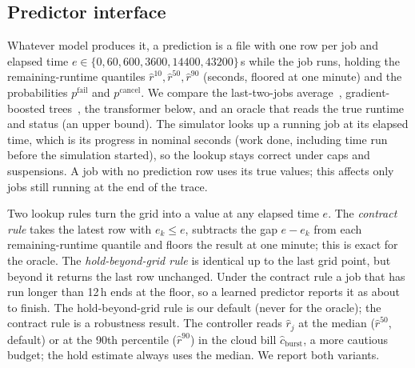 \subsection{Predictor interface}
Whatever model produces it, a prediction is a file with one row per job and elapsed time $e\in\{0,\allowbreak 60,\allowbreak 600,\allowbreak 3600,\allowbreak 14400,\allowbreak 43200\}$\,s while the job runs, holding the remaining-runtime quantiles $\hat r^{10},\hat r^{50},\hat r^{90}$ (seconds, floored at one minute) and the probabilities $p^{\text{fail}}$ and $p^{\text{cancel}}$.
We compare the last-two-jobs average~\cite{tsafrir07}, gradient-boosted trees~\cite{hu21}, the transformer below, and an oracle that reads the true runtime and status (an upper bound).
The simulator looks up a running job at its elapsed time, which is its progress in nominal seconds (work done, including time run before the simulation started), so the lookup stays correct under caps and suspensions. A job with no prediction row uses its true values; this affects only jobs still running at the end of the trace.

Two lookup rules turn the grid into a value at any elapsed time $e$. The \emph{contract rule} takes the latest row with $e_k\le e$, subtracts the gap $e-e_k$ from each remaining-runtime quantile and floors the result at one minute; this is exact for the oracle. The \emph{hold-beyond-grid rule} is identical up to the last grid point, but beyond it returns the last row unchanged. Under the contract rule a job that has run longer than 12\,h ends at the floor, so a learned predictor reports it as about to finish. The hold-beyond-grid rule is our default (never for the oracle); the contract rule is a robustness result.
The controller reads $\hat r_j$ at the median ($\hat r^{50}$, default) or at the 90th percentile ($\hat r^{90}$) in the cloud bill $\hat c_{\text{burst}}$, a more cautious budget; the hold estimate always uses the median. We report both variants.

